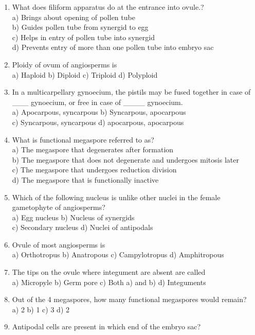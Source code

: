 \begin{enumerate}
\def\labelenumi{\arabic{enumi}.}
\setcounter{enumi}{158}
\item
  What does filiform apparatus do at the entrance into ovule.?\\
  a) Brings about opening of pollen tube\\
  b) Guides pollen tube from synergid to egg\\
  c) Helps in entry of pollen tube into synergid\\
  d) Prevents entry of more than one pollen tube into embryo sac
\item
  Ploidy of ovum of angiosperms is\\
  a) Haploid b) Diploid c) Triploid d) Polyploid
\item
  In a multicarpellary gynoecium, the pistils may be fused together in
  case of \_\_\_ gynoecium, or free in case of \_\_\_\_ gynoecium.\\
  a) Apocarpous, syncarpous b) Syncarpous, apocarpous\\
  c) Syncarpous, syncarpous d) apocarpous, apocarpous
\item
  What is functional megaspore referred to as?\\
  a) The megaspore that degenerates after formation\\
  b) The megaspore that does not degenerate and undergoes mitosis
  later\\
  c) The megaspore that undergoes reduction division\\
  d) The megaspore that is functionally inactive
\item
  Which of the following nucleus is unlike other nuclei in the female
  gametophyte of angiosperms?\\
  a) Egg nucleus b) Nucleus of synergids\\
  c) Secondary nucleus d) Nuclei of antipodals
\item
  Ovule of most angiosperms is\\
  a) Orthotropus b) Anatropous c) Campylotropus d) Amphitropous
\item
  The tips on the ovule where integument are absent are called\\
  a) Micropyle b) Germ pore c) Both a) and b) d) Integuments
\item
  Out of the 4 megaspores, how many functional megaspores would
  remain?\\
  a) 2 b) 1 c) 3 d) 2
\item
  Antipodal cells are present in which end of the embryo sac?\\

\end{enumerate}
